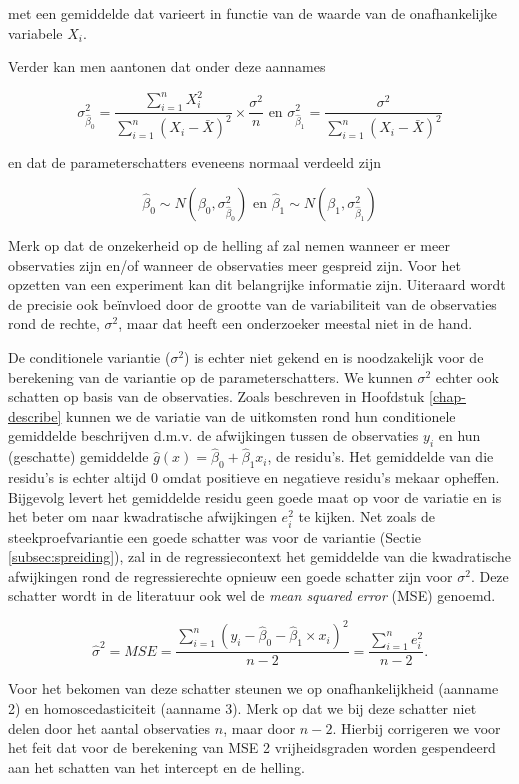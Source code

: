 \documentclass[
  12pt,dutch,coursenotes]{book}
\theoremstyle{definition}
\theoremstyle{definition}
\theoremstyle{definition}
\theoremstyle{definition}
\theoremstyle{remark}
\begin{document}
met een gemiddelde dat varieert in functie van de waarde van de onafhankelijke variabele \(X_i\).

Verder kan men aantonen dat onder deze aannames

\[\sigma^2_{\hat{\beta}_0}=\frac{\sum\limits_{i=1}^n X^2_i}{\sum\limits_{i=1}^n (X_i-\bar X)^2} \times\frac{\sigma^2}{n} \text{ en } \sigma^2_{\hat{\beta}_1}=\frac{\sigma^2}{\sum\limits_{i=1}^n (X_i-\bar X)^2}\]

en dat de parameterschatters eveneens normaal verdeeld zijn

\[\hat\beta_0 \sim N\left(\beta_0,\sigma^2_{\hat \beta_0}\right) \text{ en } \hat\beta_1 \sim N\left(\beta_1,\sigma^2_{\hat \beta_1}\right)\]

Merk op dat de onzekerheid op de helling af zal nemen wanneer er meer observaties zijn en/of wanneer de observaties meer gespreid zijn. Voor het opzetten van een experiment kan dit belangrijke informatie zijn. Uiteraard wordt de precisie ook beïnvloed door de grootte van de variabiliteit van de observaties rond de rechte, \(\sigma^2\), maar dat heeft een onderzoeker meestal niet in de hand.

De conditionele variantie (\(\sigma^2\)) is echter niet gekend en is noodzakelijk voor de berekening van de variantie op de parameterschatters. We kunnen \(\sigma^2\) echter ook schatten op basis van de observaties.
Zoals beschreven in Hoofdstuk \ref{chap-describe} kunnen we de variatie van de uitkomsten rond hun conditionele gemiddelde beschrijven d.m.v. de afwijkingen tussen de observaties \(y_i\) en hun (geschatte) gemiddelde \(\hat{g}(x)=\hat{\beta}_0+\hat{\beta}_1x_i\), de residu's.
Het gemiddelde van die residu's is echter altijd 0 omdat positieve en negatieve residu's mekaar
opheffen. Bijgevolg levert het gemiddelde residu geen goede maat op voor de variatie en is het beter om naar kwadratische afwijkingen \(e_i^2\) te kijken.
Net zoals de steekproefvariantie een goede schatter was voor de variantie (Sectie \ref{subsec:spreiding}), zal in de regressiecontext het gemiddelde van die kwadratische afwijkingen rond de regressierechte opnieuw een goede schatter zijn voor \(\sigma^2\). Deze schatter wordt in de literatuur ook wel de \emph{mean squared error} (MSE) genoemd.

\[\hat\sigma^2=MSE=\frac{\sum\limits_{i=1}^n \left(y_i-\hat\beta_0-\hat\beta_1\times x_i\right)^2}{n-2}=\frac{\sum\limits_{i=1}^n e^2_i}{n-2}.\]

Voor het bekomen van deze schatter steunen we op onafhankelijkheid (aanname 2) en homoscedasticiteit (aanname 3). Merk op dat we bij deze schatter niet delen door het aantal observaties \(n\), maar door \(n-2\). Hierbij corrigeren we voor het feit dat voor de berekening van MSE 2 vrijheidsgraden worden gespendeerd aan het schatten van het intercept en de helling.
\end{document}
